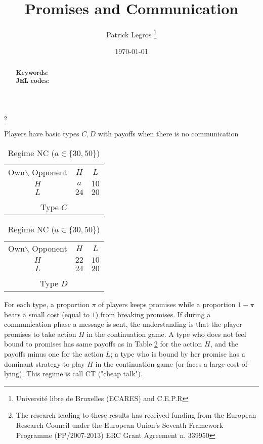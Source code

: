\documentclass[12pt]{article}
\theoremstyle{definition}
\theoremstyle{remark}
\begin{document}
\title{Promises and Communication}
\thanks{The research leading to these results has received funding from the European Research Council under the European Union's Seventh Framework Programme (FP/2007-2013) ERC Grant Agreement n. 339950}
\author{Patrick Legros
\thanks{Universit\'e libre de Bruxelles (ECARES) and C.E.P.R} } 
\date{\today}

\maketitle


\begin{abstract}
	
	\noindent \textbf{Keywords:}\\
	\noindent \textbf{JEL codes:} 
\end{abstract}


Players have basic types $C,D$ with payoffs when there is no communication
\begin{table}
	[!htbp] \centering 
	\begin{tabular}
		{c c c} {\small{Own$\backslash$} Opponent} & $H$ & $L$ \\
		\cline{2-3} $H$ & $a$& $10$\\
		\cline{2-3} $L$ & $24$& $20$ \\
		\cline{2-3}\\
		\multicolumn{3}{c}{Type $C$} 
	\end{tabular}
	\hspace{5em} 
	\begin{tabular}
		{c c c} {\small{Own$\backslash$} Opponent} & $H$ & $L$ \\
		\cline{2-3} $H$ & $22$& $10$\\
		\cline{2-3} $L$ & $24$& $20$ \\
		\cline{2-3}\\
		\multicolumn{3}{c}{Type $D$} 
	\end{tabular}
	\caption{Regime NC ($a\in\{30,50\}$)} 
\label{tbl:NC} \end{table}

For each type, a proportion $\pi$ of players keeps promises while a proportion $1-\pi$ bears a small cost (equal to $1$) from breaking promises. If during a communication phase a message is sent, the understanding is that the player promises to take action $H$ in the continuation game. A type who does not feel bound to promises has same payoffs as in Table \ref{tbl:NC} for the action $H$, and the payoffs minus one for the action $L$; a type who is bound by her promise has a dominant strategy to play $H$ in the continuation game (or faces a large cost-of-lying). This regime is call CT ("cheap talk").
\end{document}
